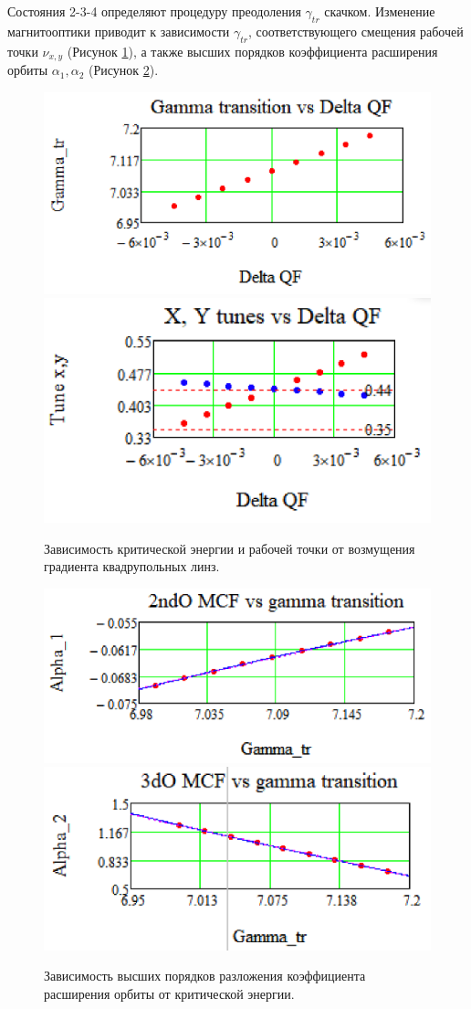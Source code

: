 \documentclass[a4paper]{panl}
\begin{document}
Состояния 2-3-4 определяют процедуру преодоления $\gamma_{tr}$ скачком. Из\-ме\-не\-ние магнитооптики приводит к зависимости $\gamma_{tr}$, соответствующего смещения рабочей точки $\nu_{x,y}$ (Рисунок \ref{fig:tr}), а также высших порядков коэффициента расширения орбиты $\alpha_1, \alpha_2$ (Рисунок \ref{fig:alpha}).

\begin{figure}[!h]
   \includegraphics*[width=.49 \columnwidth]{img/fig_02-1}
   \includegraphics*[width=.49 \columnwidth]{img/fig_02-2}
   \caption{Зависимость критической энергии и рабочей точки от возмущения градиента квадрупольных линз.}
   \label{fig:tr}
\end{figure}

\begin{figure}[!h]
   \includegraphics*[width=.49\columnwidth]{img/fig_03-1}
   \includegraphics*[width=.49\columnwidth]{img/fig_03-2}
   \caption{Зависимость высших порядков разложения коэффициента расширения орбиты от критической энергии.}
   \label{fig:alpha}
\end{figure}

\label{sec:jump}
\end{document}
